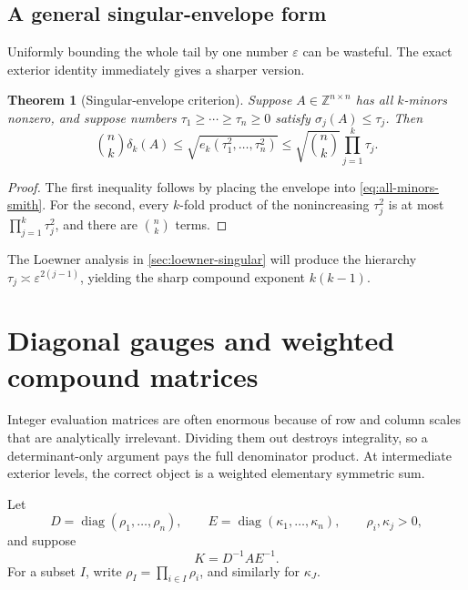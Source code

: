\documentclass[11pt,oneside]{article}
\newtheorem{theorem}{Theorem}[section]
\theoremstyle{definition}
\theoremstyle{remark}
\newcommand{\Z}{\mathbb{Z}}
\newcommand{\diag}{\operatorname{diag}}
\newcommand{\eps}{\varepsilon}
\begin{document}
\subsection{A general singular-envelope form}

Uniformly bounding the whole tail by one number $\eps$ can be wasteful.  The exact exterior identity immediately gives a sharper version.

\begin{theorem}[Singular-envelope criterion]
\label{thm:singular-envelope}
Suppose $A\in\Z^{n\times n}$ has all $k$-minors nonzero, and suppose numbers
$\tau_1\ge\cdots\ge\tau_n\ge0$ satisfy $\sigma_j(A)\le\tau_j$.  Then
\begin{equation}
 \binom nk\delta_k(A)
 \le \sqrt{e_k(\tau_1^2,\dots,\tau_n^2)}
 \le \sqrt{\binom nk}\prod_{j=1}^k\tau_j.
 \label{eq:singular-envelope}
\end{equation}
\end{theorem}

\begin{proof}
The first inequality follows by placing the envelope into \eqref{eq:all-minors-smith}.  For the second, every $k$-fold product of the nonincreasing $\tau_j^2$ is at most $\prod_{j=1}^k\tau_j^2$, and there are $\binom nk$ terms.
\end{proof}

The Loewner analysis in \cref{sec:loewner-singular} will produce the hierarchy $\tau_j\asymp\eps^{2(j-1)}$, yielding the sharp compound exponent $k(k-1)$.

\section{Diagonal gauges and weighted compound matrices}
\label{sec:weighted}

Integer evaluation matrices are often enormous because of row and column scales that are analytically irrelevant.  Dividing them out destroys integrality, so a determinant-only argument pays the full denominator product.  At intermediate exterior levels, the correct object is a weighted elementary symmetric sum.

Let
\[
 D=\diag(\rho_1,\dots,\rho_n),\qquad
 E=\diag(\kappa_1,\dots,\kappa_n),
 \qquad \rho_i,\kappa_j>0,
\]
and suppose
\begin{equation}
 K=D^{-1}AE^{-1}.
 \label{eq:gauge}
\end{equation}
For a subset $I$, write $\rho_I=\prod_{i\in I}\rho_i$, and similarly for $\kappa_J$.
\end{document}
